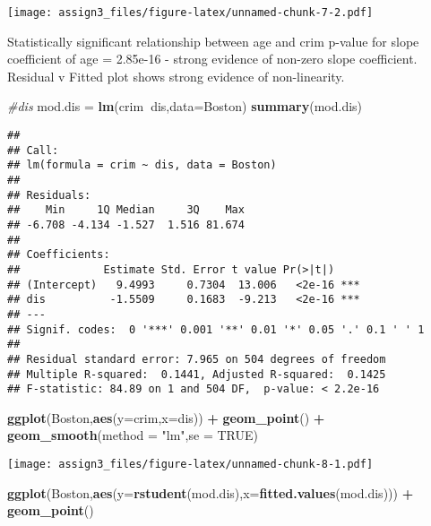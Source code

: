\documentclass[]{article}
\newenvironment{Shaded}{\begin{snugshade}}{\end{snugshade}}
\newcommand{\CommentTok}[1]{\textcolor[rgb]{0.56,0.35,0.01}{\textit{#1}}}
\newcommand{\DataTypeTok}[1]{\textcolor[rgb]{0.13,0.29,0.53}{#1}}
\newcommand{\KeywordTok}[1]{\textcolor[rgb]{0.13,0.29,0.53}{\textbf{#1}}}
\newcommand{\NormalTok}[1]{#1}
\newcommand{\OperatorTok}[1]{\textcolor[rgb]{0.81,0.36,0.00}{\textbf{#1}}}
\newcommand{\OtherTok}[1]{\textcolor[rgb]{0.56,0.35,0.01}{#1}}
\newcommand{\StringTok}[1]{\textcolor[rgb]{0.31,0.60,0.02}{#1}}
\begin{document}
\texttt{[image: assign3\_files/figure-latex/unnamed-chunk-7-2.pdf]}

Statistically significant relationship between age and crim p-value for
slope coefficient of age = 2.85e-16 - strong evidence of non-zero slope
coefficient. Residual v Fitted plot shows strong evidence of
non-linearity.

\begin{Shaded}
\begin{Highlighting}[]
\CommentTok{#dis}
\NormalTok{mod.dis =}\StringTok{ }\KeywordTok{lm}\NormalTok{(crim}\OperatorTok{~}\NormalTok{dis,}\DataTypeTok{data=}\NormalTok{Boston)}
\KeywordTok{summary}\NormalTok{(mod.dis)}
\end{Highlighting}
\end{Shaded}

\begin{verbatim}
## 
## Call:
## lm(formula = crim ~ dis, data = Boston)
## 
## Residuals:
##    Min     1Q Median     3Q    Max 
## -6.708 -4.134 -1.527  1.516 81.674 
## 
## Coefficients:
##             Estimate Std. Error t value Pr(>|t|)    
## (Intercept)   9.4993     0.7304  13.006   <2e-16 ***
## dis          -1.5509     0.1683  -9.213   <2e-16 ***
## ---
## Signif. codes:  0 '***' 0.001 '**' 0.01 '*' 0.05 '.' 0.1 ' ' 1
## 
## Residual standard error: 7.965 on 504 degrees of freedom
## Multiple R-squared:  0.1441, Adjusted R-squared:  0.1425 
## F-statistic: 84.89 on 1 and 504 DF,  p-value: < 2.2e-16
\end{verbatim}

\begin{Shaded}
\begin{Highlighting}[]
\KeywordTok{ggplot}\NormalTok{(Boston,}\KeywordTok{aes}\NormalTok{(}\DataTypeTok{y=}\NormalTok{crim,}\DataTypeTok{x=}\NormalTok{dis)) }\OperatorTok{+}\StringTok{ }\KeywordTok{geom_point}\NormalTok{() }\OperatorTok{+}\StringTok{ }\KeywordTok{geom_smooth}\NormalTok{(}\DataTypeTok{method =} \StringTok{"lm"}\NormalTok{,}\DataTypeTok{se =} \OtherTok{TRUE}\NormalTok{)}
\end{Highlighting}
\end{Shaded}

\texttt{[image: assign3\_files/figure-latex/unnamed-chunk-8-1.pdf]}

\begin{Shaded}
\begin{Highlighting}[]
\KeywordTok{ggplot}\NormalTok{(Boston,}\KeywordTok{aes}\NormalTok{(}\DataTypeTok{y=}\KeywordTok{rstudent}\NormalTok{(mod.dis),}\DataTypeTok{x=}\KeywordTok{fitted.values}\NormalTok{(mod.dis))) }\OperatorTok{+}\StringTok{ }\KeywordTok{geom_point}\NormalTok{() }
\end{Highlighting}
\end{Shaded}
\end{document}
